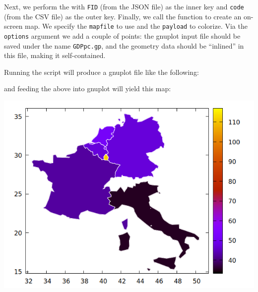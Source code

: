\documentclass{article}
\begin{document}
Next, we perform the  with \texttt{FID} (from the JSON file)
as the inner key and \texttt{code} (from the CSV file) as the outer
key. Finally, we call the  function to create an
on-screen map. We specify the \texttt{mapfile} to use and the
\texttt{payload} to colorize. Via the \texttt{options} argument we add
a couple of points: the gnuplot input file should be saved under the
name \texttt{GDPpc.gp}, and the geometry data should be ``inlined'' in
this file, making it self-contained.

Running the script will produce a gnuplot file like the following:


and feeding the above into gnuplot will yield  this map:

\begin{center}
  \includegraphics[scale=0.5]{GDPpc.png}
\end{center}
\end{document}
